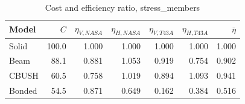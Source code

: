 \begin{table}[H]
    \centering
    \caption{Cost and efficiency ratio, stress\_members}
    \label{tab:cost_efficiency_ratio_summary}
    \begin{tabular}{lrrrrrr}
        \toprule
        \textbf{Model} & \textbf{$C$} & \textbf{$\eta_{V,NASA}$} & \textbf{$\eta_{H,NASA}$} & \textbf{$\eta_{V,T43A}$} & \textbf{$\eta_{H,T43A}$} & \textbf{$\bar{\eta}$} \\
        \midrule
        Solid & 100.0 & 1.000 & 1.000 & 1.000 & 1.000 & 1.000 \\
        Beam & 88.1 & 0.881 & 1.053 & 0.919 & 0.754 & 0.902 \\
        CBUSH & 60.5 & 0.758 & 1.019 & 0.894 & 1.093 & 0.941 \\
        Bonded & 54.5 & 0.871 & 0.649 & 0.162 & 0.384 & 0.516 \\
        \bottomrule
    \end{tabular}
\end{table}

